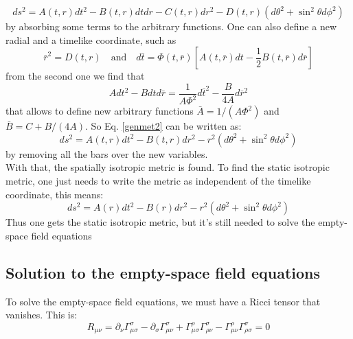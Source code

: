 \documentclass[letterpaper,11pt,onecolumn]{article}
\begin{document}
\begin{equation}
d s^{2}=A(t, r) d t^{2}-B(t, r) d t d r-C(t, r) d r^{2}-D(t, r)\left(d \theta^{2}+\sin ^{2} \theta d \phi^{2}\right)
\label{genmet2}
\end{equation}
by absorbing some terms to the arbitrary functions. One can also define a new radial and a timelike coordinate, such as 
\begin{equation}
\bar{r}^{2}=D(t, r) \quad \text{and} \quad d \bar{t}=\Phi(t, \bar{r})\left[A(t, \bar{r}) d t-\frac{1}{2} B(t, \bar{r}) d \bar{r}\right]\nonumber
\end{equation}
from the second one we find that 
\begin{equation}
A d t^{2}-B d t d \bar{r}=\frac{1}{A \Phi^{2}} d \bar{t}^{2}-\frac{B}{4 A} d \bar{r}^{2} \nonumber
\end{equation}
that allows to define new arbitrary functions $\bar{A}=1 /\left(A \Phi^{2}\right)$ and $\bar{B}=C+B /(4 A)$. So Eq. \ref{genmet2} can be written as:
\begin{equation}
d s^{2}=A(t, r) d t^{2}-B(t, r) d r^{2}-r^{2}\left(d \theta^{2}+\sin ^{2} \theta d \phi^{2}\right)\nonumber
\end{equation}
by removing all the bars over the new variables.\\
With that, the spatially isotropic metric is found. To find the static isotropic metric, one just needs to write the metric as independent of the timelike coordinate, this means: 
\begin{equation}
d s^{2}=A( r) d t^{2}-B( r) d r^{2}-r^{2}\left(d \theta^{2}+\sin ^{2} \theta d \phi^{2}\right)\nonumber
\end{equation}
Thus one gets the static isotropic metric, but it's still needed to solve the empty-space field equations
\subsection{Solution to the empty-space field equations}
To solve the empty-space field equations, we must have a Ricci tensor that vanishes. This is:
\begin{equation}
        R_{\mu \nu}=\partial_{\nu} \Gamma_{\mu \sigma}^{\sigma}-\partial_{\sigma} \Gamma_{\mu \nu}^{\sigma}+\Gamma_{\mu \sigma}^{\rho} \Gamma_{\rho \nu}^{\sigma}-\Gamma_{\mu \nu}^{\rho} \Gamma_{\rho \sigma}^{\sigma}=0
        \label{ricci}
\end{equation}
\end{document}
